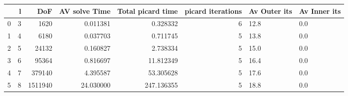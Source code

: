 \begin{tabular}{lrrrrrll}
\toprule
{} &  l &      DoF &  AV solve Time &  Total picard time &  picard iterations & Av Outer its & Av Inner its \\
\midrule
0 &  3 &     1620 &       0.011381 &           0.328332 &                  6 &         12.8 &          0.0 \\
1 &  4 &     6180 &       0.037703 &           0.711745 &                  5 &         13.8 &          0.0 \\
2 &  5 &    24132 &       0.160827 &           2.738334 &                  5 &         15.0 &          0.0 \\
3 &  6 &    95364 &       0.816697 &          11.812349 &                  5 &         16.4 &          0.0 \\
4 &  7 &   379140 &       4.395587 &          53.305628 &                  5 &         17.6 &          0.0 \\
5 &  8 &  1511940 &      24.030000 &         247.136355 &                  5 &         18.8 &          0.0 \\
\bottomrule
\end{tabular}
